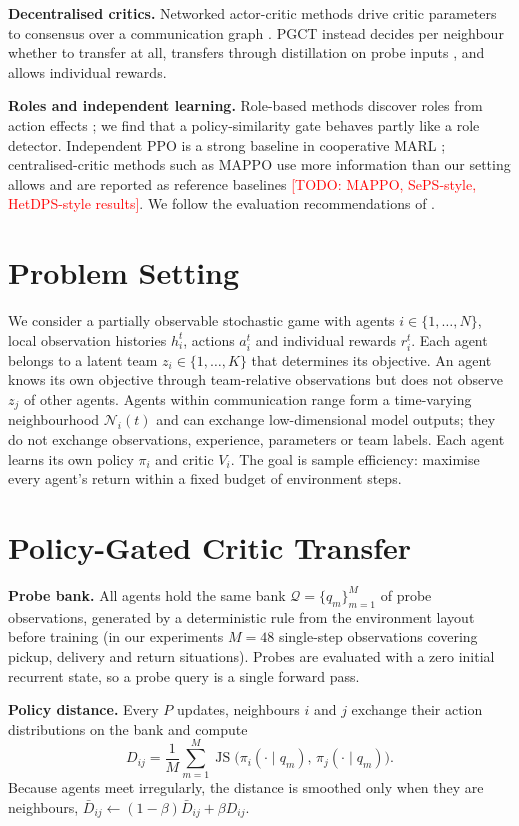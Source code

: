 \documentclass{article}
\newcommand{\todo}[1]{\textcolor{red}{[TODO: #1]}}
\newcommand{\JS}{\operatorname{JS}}
\newcommand{\ours}{PGCT}
\begin{document}
\textbf{Decentralised critics.} Networked actor-critic methods drive critic parameters to consensus over a
communication graph \cite{zhang2018networked}. \ours{} instead decides per neighbour whether to transfer at all,
transfers through distillation on probe inputs \cite{rusu2016policy}, and allows individual rewards.

\textbf{Roles and independent learning.} Role-based methods discover roles from action effects
\cite{wang2021rode}; we find that a policy-similarity gate behaves partly like a role detector.
Independent PPO is a strong baseline in cooperative MARL \cite{schulman2017ppo,dewitt2020ippo}; centralised-critic
methods such as MAPPO \cite{yu2022mappo} use more information than our setting allows and are reported as
reference baselines \todo{MAPPO, SePS-style, HetDPS-style results}. We follow the evaluation recommendations of
\cite{agarwal2021precipice}.

\section{Problem Setting}
We consider a partially observable stochastic game with agents $i\in\{1,\dots,N\}$, local observation histories
$h_i^t$, actions $a_i^t$ and individual rewards $r_i^t$. Each agent belongs to a latent team $z_i\in\{1,\dots,K\}$
that determines its objective. An agent knows its own objective through team-relative observations but does not
observe $z_j$ of other agents. Agents within communication range form a time-varying neighbourhood
$\mathcal{N}_i(t)$ and can exchange low-dimensional model outputs; they do not exchange observations, experience,
parameters or team labels. Each agent learns its own policy $\pi_i$ and critic $V_i$. The goal is sample
efficiency: maximise every agent's return within a fixed budget of environment steps.

\section{Policy-Gated Critic Transfer}
\label{sec:method}
\textbf{Probe bank.} All agents hold the same bank $\mathcal{Q}=\{q_m\}_{m=1}^{M}$ of probe observations,
generated by a deterministic rule from the environment layout before training (in our experiments $M=48$
single-step observations covering pickup, delivery and return situations). Probes are evaluated with a zero
initial recurrent state, so a probe query is a single forward pass.

\textbf{Policy distance.} Every $P$ updates, neighbours $i$ and $j$ exchange their action distributions on the
bank and compute
\begin{equation}
  D_{ij} = \frac{1}{M}\sum_{m=1}^{M} \JS\big(\pi_i(\cdot\mid q_m),\, \pi_j(\cdot\mid q_m)\big).
\end{equation}
Because agents meet irregularly, the distance is smoothed only when they are neighbours,
$\bar D_{ij}\leftarrow(1-\beta)\bar D_{ij}+\beta D_{ij}$.
\end{document}
